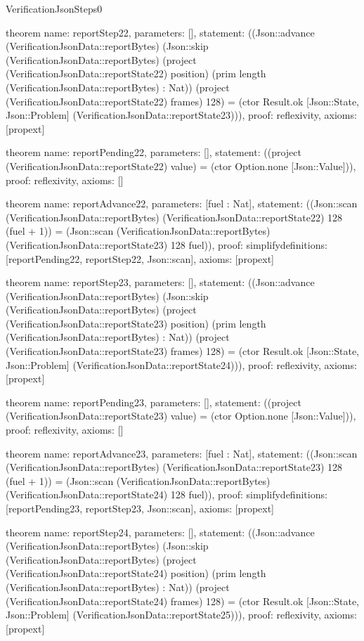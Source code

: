 \begin{lexlean}{VerificationJsonSteps0}
\begin{semanticmodule}
theorem{
  name: reportStep22,
  parameters: [],
  statement: ((Json::advance (VerificationJsonData::reportBytes) (Json::skip (VerificationJsonData::reportBytes) (project (VerificationJsonData::reportState22) position) (prim length (VerificationJsonData::reportBytes) : Nat)) (project (VerificationJsonData::reportState22) frames) 128) = (ctor Result.ok [Json::State, Json::Problem] (VerificationJsonData::reportState23))),
  proof: reflexivity{},
  axioms: [propext]
}

theorem{
  name: reportPending22,
  parameters: [],
  statement: ((project (VerificationJsonData::reportState22) value) = (ctor Option.none [Json::Value])),
  proof: reflexivity{},
  axioms: []
}

theorem{
  name: reportAdvance22,
  parameters: [fuel : Nat],
  statement: ((Json::scan (VerificationJsonData::reportBytes) (VerificationJsonData::reportState22) 128 (fuel + 1)) = (Json::scan (VerificationJsonData::reportBytes) (VerificationJsonData::reportState23) 128 fuel)),
  proof: simplify{definitions: [reportPending22, reportStep22, Json::scan]},
  axioms: [propext]
}

theorem{
  name: reportStep23,
  parameters: [],
  statement: ((Json::advance (VerificationJsonData::reportBytes) (Json::skip (VerificationJsonData::reportBytes) (project (VerificationJsonData::reportState23) position) (prim length (VerificationJsonData::reportBytes) : Nat)) (project (VerificationJsonData::reportState23) frames) 128) = (ctor Result.ok [Json::State, Json::Problem] (VerificationJsonData::reportState24))),
  proof: reflexivity{},
  axioms: [propext]
}

theorem{
  name: reportPending23,
  parameters: [],
  statement: ((project (VerificationJsonData::reportState23) value) = (ctor Option.none [Json::Value])),
  proof: reflexivity{},
  axioms: []
}

theorem{
  name: reportAdvance23,
  parameters: [fuel : Nat],
  statement: ((Json::scan (VerificationJsonData::reportBytes) (VerificationJsonData::reportState23) 128 (fuel + 1)) = (Json::scan (VerificationJsonData::reportBytes) (VerificationJsonData::reportState24) 128 fuel)),
  proof: simplify{definitions: [reportPending23, reportStep23, Json::scan]},
  axioms: [propext]
}

theorem{
  name: reportStep24,
  parameters: [],
  statement: ((Json::advance (VerificationJsonData::reportBytes) (Json::skip (VerificationJsonData::reportBytes) (project (VerificationJsonData::reportState24) position) (prim length (VerificationJsonData::reportBytes) : Nat)) (project (VerificationJsonData::reportState24) frames) 128) = (ctor Result.ok [Json::State, Json::Problem] (VerificationJsonData::reportState25))),
  proof: reflexivity{},
  axioms: [propext]
}


\end{semanticmodule}
\end{lexlean}
